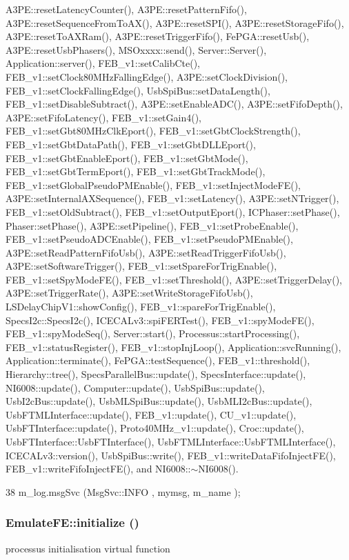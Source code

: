 A3PE::resetLatencyCounter(), A3PE::resetPatternFifo(), A3PE::resetSequenceFromToAX(), A3PE::resetSPI(), A3PE::resetStorageFifo(), A3PE::resetToAXRam(), A3PE::resetTriggerFifo(), FePGA::resetUsb(), A3PE::resetUsbPhasers(), MSOxxxx::send(), Server::Server(), Application::server(), FEB\_\-v1::setCalibCte(), FEB\_\-v1::setClock80MHzFallingEdge(), A3PE::setClockDivision(), FEB\_\-v1::setClockFallingEdge(), UsbSpiBus::setDataLength(), FEB\_\-v1::setDisableSubtract(), A3PE::setEnableADC(), A3PE::setFifoDepth(), A3PE::setFifoLatency(), FEB\_\-v1::setGain4(), FEB\_\-v1::setGbt80MHzClkEport(), FEB\_\-v1::setGbtClockStrength(), FEB\_\-v1::setGbtDataPath(), FEB\_\-v1::setGbtDLLEport(), FEB\_\-v1::setGbtEnableEport(), FEB\_\-v1::setGbtMode(), FEB\_\-v1::setGbtTermEport(), FEB\_\-v1::setGbtTrackMode(), FEB\_\-v1::setGlobalPseudoPMEnable(), FEB\_\-v1::setInjectModeFE(), A3PE::setInternalAXSequence(), FEB\_\-v1::setLatency(), A3PE::setNTrigger(), FEB\_\-v1::setOldSubtract(), FEB\_\-v1::setOutputEport(), ICPhaser::setPhase(), Phaser::setPhase(), A3PE::setPipeline(), FEB\_\-v1::setProbeEnable(), FEB\_\-v1::setPseudoADCEnable(), FEB\_\-v1::setPseudoPMEnable(), A3PE::setReadPatternFifoUsb(), A3PE::setReadTriggerFifoUsb(), A3PE::setSoftwareTrigger(), FEB\_\-v1::setSpareForTrigEnable(), FEB\_\-v1::setSpyModeFE(), FEB\_\-v1::setThreshold(), A3PE::setTriggerDelay(), A3PE::setTriggerRate(), A3PE::setWriteStorageFifoUsb(), LSDelayChipV1::showConfig(), FEB\_\-v1::spareForTrigEnable(), SpecsI2c::SpecsI2c(), ICECALv3::spiFERTest(), FEB\_\-v1::spyModeFE(), FEB\_\-v1::spyModeSeq(), Server::start(), Processus::startProcessing(), FEB\_\-v1::statusRegister(), FEB\_\-v1::stopInjLoop(), Application::svcRunning(), Application::terminate(), FePGA::testSequence(), FEB\_\-v1::threshold(), Hierarchy::tree(), SpecsParallelBus::update(), SpecsInterface::update(), NI6008::update(), Computer::update(), UsbSpiBus::update(), UsbI2cBus::update(), UsbMLSpiBus::update(), UsbMLI2cBus::update(), UsbFTMLInterface::update(), FEB\_\-v1::update(), CU\_\-v1::update(), UsbFTInterface::update(), Proto40MHz\_\-v1::update(), Croc::update(), UsbFTInterface::UsbFTInterface(), UsbFTMLInterface::UsbFTMLInterface(), ICECALv3::version(), UsbSpiBus::write(), FEB\_\-v1::writeDataFifoInjectFE(), FEB\_\-v1::writeFifoInjectFE(), and NI6008::$\sim$NI6008().


\begin{DoxyCode}
38 { m_log.msgSvc (MsgSvc::INFO    , mymsg, m_name ); }
\end{DoxyCode}
\hypertarget{classEmulateFE_aeb689a366ed5e675d02d08ee787d338e}{
\subsubsection[{initialize}]{ EmulateFE::initialize ()}}
\label{classEmulateFE_aeb689a366ed5e675d02d08ee787d338e}
processus initialisation virtual function 

